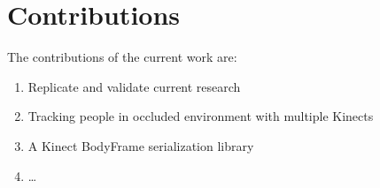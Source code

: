 \section{Contributions}
\label{sec:contributions}

The contributions of the current work are:

\begin{enumerate}
  \item Replicate and validate current research
  \item Tracking people in occluded environment with multiple Kinects
  \item A Kinect BodyFrame serialization library
  \item \dots
\end{enumerate}
